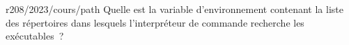 \begin{question}{r208/2023/cours/path}
Quelle est la variable d'environnement contenant la liste des
répertoires dans lesquels l'interpréteur de commande recherche les
exécutables~?
%
\begin{reponses}
\end{reponses}
\end{question}
